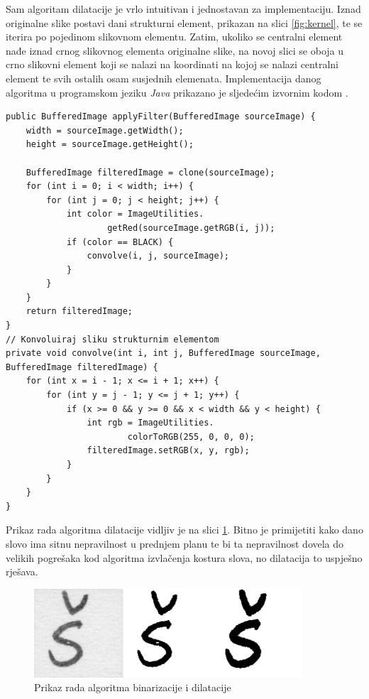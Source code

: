 Sam algoritam dilatacije je vrlo intuitivan i jednostavan za implementaciju. Iznad originalne slike postavi dani strukturni element, prikazan na slici \ref{fig:kernel}, te se iterira po pojedinom slikovnom elementu. Zatim, ukoliko se centralni element nađe iznad crnog slikovnog elementa originalne slike, na novoj slici se oboja u crno slikovni element koji se nalazi na koordinati na kojoj se nalazi centralni element te svih ostalih osam susjednih elemenata. Implementacija danog algoritma u programskom jeziku \emph{Java} prikazano je sljedećim izvornim kodom \citep{Gonzalez}.
\lstset{language=Java, tabsize=2}
\begin{lstlisting}
public BufferedImage applyFilter(BufferedImage sourceImage) {
    width = sourceImage.getWidth();
    height = sourceImage.getHeight();
    
    BufferedImage filteredImage = clone(sourceImage);
    for (int i = 0; i < width; i++) {
        for (int j = 0; j < height; j++) {
            int color = ImageUtilities.
                    getRed(sourceImage.getRGB(i, j));
            if (color == BLACK) {
                convolve(i, j, sourceImage);
            }
        }
    }
    return filteredImage;
}
// Konvoluiraj sliku strukturnim elementom
private void convolve(int i, int j, BufferedImage sourceImage, BufferedImage filteredImage) {
    for (int x = i - 1; x <= i + 1; x++) {
        for (int y = j - 1; y <= j + 1; y++) {
            if (x >= 0 && y >= 0 && x < width && y < height) {
                int rgb = ImageUtilities.
                        colorToRGB(255, 0, 0, 0);
                filteredImage.setRGB(x, y, rgb);
            }
        }
    }
}
\end{lstlisting}

Prikaz rada algoritma dilatacije vidljiv je na slici \ref{fig:dilation_good_example}. Bitno je primijetiti kako dano slovo ima sitnu nepravilnost u prednjem planu te bi ta nepravilnost dovela do velikih pogrešaka kod algoritma izvlačenja kostura slova, no dilatacija to uspješno rješava.
\begin{figure}[htb]
    \centering
    \includegraphics[width=10cm]{images/dilation_example.png}
    \caption{Prikaz rada algoritma binarizacije i dilatacije}
    \label{fig:dilation_good_example}
\end{figure}

